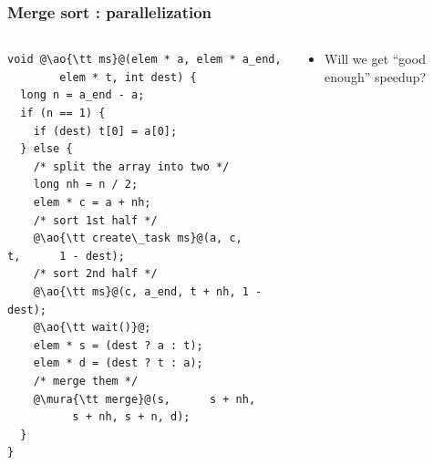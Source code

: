 \documentclass[12pt,dvipdfmx]{beamer}
\newcommand{\mura}[1]{{\color{purple}#1}}
\newcommand{\ao}[1]{{\color{blue}#1}}
\begin{document}
\begin{frame}[fragile]
\frametitle{Merge sort : parallelization}
\begin{columns}
\begin{column}{0.6\textwidth}
\begin{lstlisting}
void @\ao{\tt ms}@(elem * a, elem * a_end, 
        elem * t, int dest) {
  long n = a_end - a;
  if (n == 1) {
    if (dest) t[0] = a[0];
  } else {
    /* split the array into two */
    long nh = n / 2;
    elem * c = a + nh;
    /* sort 1st half */
    @\ao{\tt create\_task ms}@(a, c,     t,      1 - dest);
    /* sort 2nd half */
    @\ao{\tt ms}@(c, a_end, t + nh, 1 - dest);
    @\ao{\tt wait()}@;
    elem * s = (dest ? a : t);
    elem * d = (dest ? t : a);
    /* merge them */
    @\mura{\tt merge}@(s,      s + nh, 
          s + nh, s + n, d);
  }
}
\end{lstlisting}
\end{column}

\begin{column}{0.4\textwidth}
\begin{itemize}
\item Will we get ``good enough'' speedup?
\end{itemize}
\end{column}

\end{columns}
\end{frame}

\end{document}
